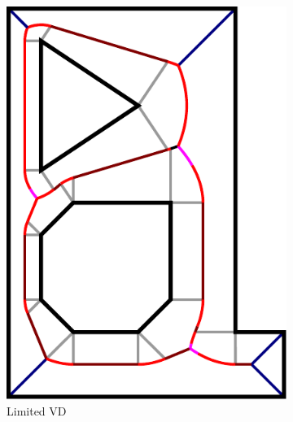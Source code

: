 \begin{figure}
\begin{subfigure}{0.3\columnwidth}
\includegraphics[width=\columnwidth]{sources/method/Voronoi_example.pdf}
\caption{Limited VD}
\end{subfigure}
\begin{subfigure}{0.3\columnwidth}

\end{subfigure}
\end{figure}
